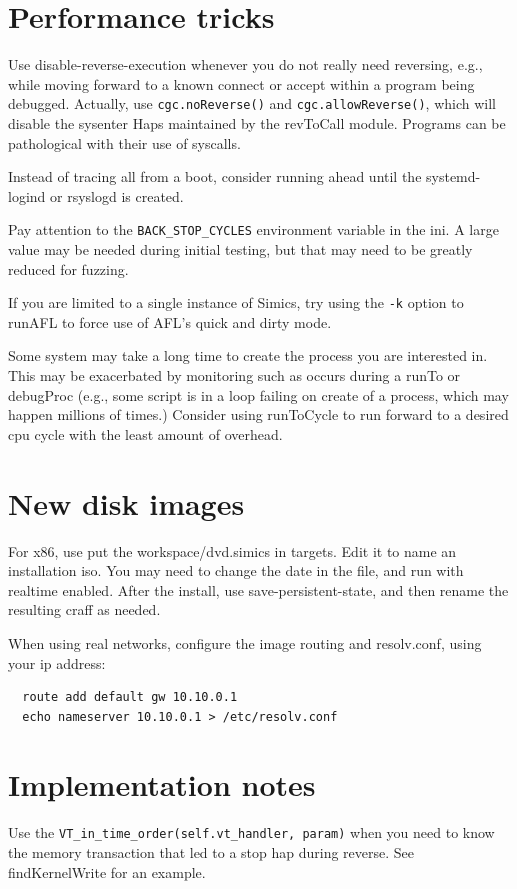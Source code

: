 \documentclass[titlepage]{article}
\begin{document}
\begin{appendices}
\section{Performance tricks}
Use disable-reverse-execution whenever you do not really need reversing, e.g., while moving forward to a known connect or accept
within a program being debugged.  Actually, use {\tt cgc.noReverse()} and {\tt cgc.allowReverse()}, which will disable the sysenter
Haps maintained by the revToCall module.  Programs can be pathological with their use of syscalls.

Instead of tracing all from a boot, consider running ahead until the systemd-logind or rsyslogd is created.

Pay attention to the {\tt BACK\_STOP\_CYCLES} environment variable in the ini.  A large value may be needed during initial testing,
but that may need to be greatly reduced for fuzzing.

If you are limited to a single instance of Simics, try using the {\tt -k} option to runAFL to force use of AFL's quick and dirty mode.

Some system may take a long time to create the process you are interested in.  This may be exacerbated by monitoring such as occurs during
a runTo or debugProc (e.g., some script is in a loop failing on create of a process, which may happen millions of times.)  Consider using
runToCycle to run forward to a desired cpu cycle with the least amount of overhead.

\section{New disk images}
For x86, use put the workspace/dvd.simics in targets.  Edit it to name an installation iso.  You may need to change the date in
the file, and run with realtime enabled.  After the install, use save-persistent-state, and then rename the resulting craff as
needed.

When using real networks, configure the image routing and resolv.conf, using your ip address:
\begin{verbatim}
  route add default gw 10.10.0.1
  echo nameserver 10.10.0.1 > /etc/resolv.conf
\end{verbatim}


\section{Implementation notes}
Use the {\tt VT\_in\_time\_order(self.vt\_handler, param)} when you need to know the memory transaction that
led to a stop hap during reverse.  See findKernelWrite for an example.


\end{appendices}
\end{document}
